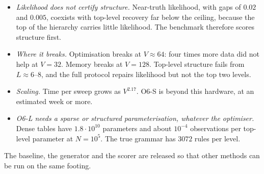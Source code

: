 \documentclass[11pt]{article}
\theoremstyle{definition}
\theoremstyle{remark}
\begin{document}
\begin{itemize}
  \item \emph{Likelihood does not certify structure.} Near-truth likelihood, with gaps of $0.02$ and $0.005$, coexists with top-level recovery far below the ceiling, because the top of the hierarchy carries little likelihood. The benchmark therefore scores structure first.
  \item \emph{Where it breaks.} Optimisation breaks at $V\approx64$: four times more data did not help at $V{=}32$. Memory breaks at $V{=}128$. Top-level structure fails from $L\approx6$--$8$, and the full protocol repairs likelihood but not the top two levels.
  \item \emph{Scaling.} Time per sweep grows as $V^{2.17}$. O6-S is beyond this hardware, at an estimated week or more.
  \item \emph{O6-L needs a sparse or structured parameterisation, whatever the optimiser.} Dense tables have $1.8\cdot10^{10}$ parameters and about $10^{-4}$ observations per top-level parameter at $N=10^5$. The true grammar has $3072$ rules per level.
\end{itemize}
The baseline, the generator and the scorer are released so that other methods can be run on the same footing.
\end{document}
